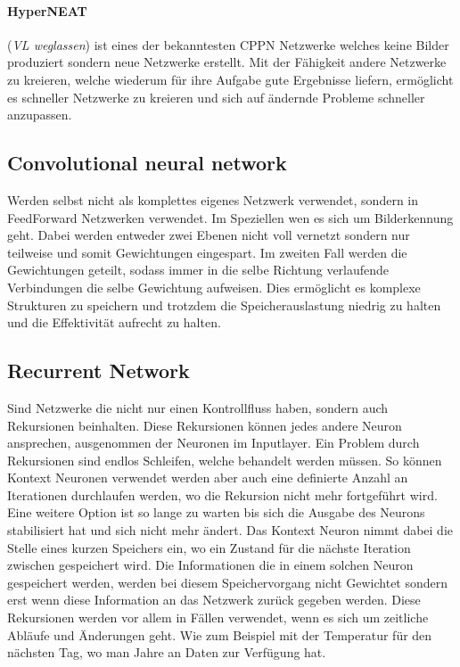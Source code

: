 \paragraph{HyperNEAT} (\textit{VL weglassen}) ist eines der bekanntesten CPPN Netzwerke welches keine Bilder produziert sondern neue Netzwerke erstellt.
Mit der Fähigkeit andere Netzwerke zu kreieren, welche wiederum für ihre Aufgabe gute Ergebnisse liefern, ermöglicht es schneller Netzwerke zu kreieren und sich auf ändernde Probleme schneller anzupassen.

\subsection{Convolutional neural network}

Werden selbst nicht als komplettes eigenes Netzwerk verwendet, sondern in FeedForward Netzwerken verwendet.
Im Speziellen wen es sich um Bilderkennung geht.
Dabei werden entweder zwei Ebenen nicht voll vernetzt sondern nur teilweise und somit Gewichtungen eingespart.
Im zweiten Fall werden die Gewichtungen geteilt, sodass immer in die selbe Richtung verlaufende Verbindungen die selbe Gewichtung aufweisen.
Dies ermöglicht es komplexe Strukturen zu speichern und trotzdem die Speicherauslastung niedrig zu halten und die Effektivität aufrecht zu halten.


\subsection{Recurrent Network}

Sind Netzwerke die nicht nur einen Kontrollfluss haben, sondern auch Rekursionen beinhalten. 
Diese Rekursionen können jedes andere Neuron ansprechen, ausgenommen der Neuronen im Inputlayer.
Ein Problem durch Rekursionen sind endlos Schleifen, welche behandelt werden müssen.
So können Kontext Neuronen verwendet werden aber auch eine definierte Anzahl an Iterationen durchlaufen werden, wo die Rekursion nicht mehr fortgeführt wird. 
Eine weitere Option ist so lange zu warten bis sich die Ausgabe des Neurons stabilisiert hat und sich nicht mehr ändert.
Das Kontext Neuron nimmt dabei die Stelle eines kurzen Speichers ein, wo ein Zustand für die nächste Iteration zwischen gespeichert wird.
Die Informationen die in einem solchen Neuron gespeichert werden, werden bei diesem Speichervorgang nicht Gewichtet sondern erst wenn diese Information an das Netzwerk zurück gegeben werden.
Diese Rekursionen werden vor allem in Fällen verwendet, wenn es sich um zeitliche Abläufe und Änderungen geht. 
Wie zum Beispiel mit der Temperatur für den nächsten Tag, wo man Jahre an Daten zur Verfügung hat.

